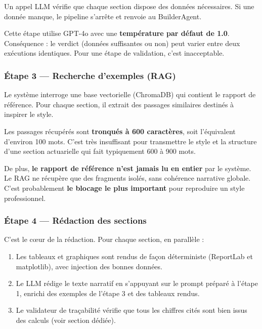 \documentclass[12pt,a4paper]{article}
\begin{document}
Un appel LLM vérifie que chaque section dispose des données nécessaires.
Si une donnée manque, le pipeline s'arrête et renvoie au BuilderAgent.

\begin{blockerbox}
Cette étape utilise GPT-4o avec une \textbf{température par défaut de 1.0}.
Conséquence : le verdict (données suffisantes ou non) peut varier entre deux exécutions
identiques. Pour une étape de validation, c'est inacceptable.
\end{blockerbox}

\subsubsection{Étape 3 — Recherche d'exemples (RAG)}

Le système interroge une base vectorielle (ChromaDB) qui contient le rapport
de référence. Pour chaque section, il extrait des passages similaires destinés
à inspirer le style.

\begin{blockerbox}
Les passages récupérés sont \textbf{tronqués à 600 caractères}, soit l'équivalent
d'environ 100 mots. C'est très insuffisant pour transmettre le style et la
structure d'une section actuarielle qui fait typiquement 600 à 900 mots.

De plus, \textbf{le rapport de référence n'est jamais lu en entier} par le système.
Le RAG ne récupère que des fragments isolés, sans cohérence narrative globale.
C'est probablement \textbf{le blocage le plus important} pour reproduire un style
professionnel.
\end{blockerbox}

\subsubsection{Étape 4 — Rédaction des sections}

C'est le cœur de la rédaction. Pour chaque section, en parallèle :

\begin{enumerate}[leftmargin=2em]
  \item Les tableaux et graphiques sont rendus de façon déterministe
        (ReportLab et matplotlib), avec injection des bonnes données.
  \item Le LLM rédige le texte narratif en s'appuyant sur le prompt préparé
        à l'étape 1, enrichi des exemples de l'étape 3 et des tableaux rendus.
  \item Le validateur de traçabilité vérifie que tous les chiffres cités sont
        bien issus des calculs (voir section dédiée).
\end{enumerate}
\end{document}
